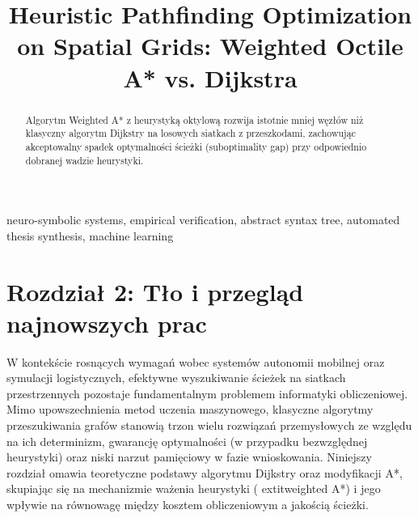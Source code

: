 \documentclass[conference]{IEEEtran}
\begin{document}
\title{Heuristic Pathfinding Optimization on Spatial Grids: Weighted Octile A* vs. Dijkstra}

\author{
}

\maketitle
\thispagestyle{plain}

\begin{abstract}
Algorytm Weighted A* z heurystyką oktylową rozwija istotnie mniej węzłów niż klasyczny algorytm Dijkstry na losowych siatkach z przeszkodami, zachowując akceptowalny spadek optymalności ścieżki (suboptimality gap) przy odpowiednio dobranej wadzie heurystyki.
\end{abstract}

\begin{IEEEkeywords}
neuro-symbolic systems, empirical verification, abstract syntax tree, automated thesis synthesis, machine learning
\end{IEEEkeywords}

\section{Rozdział 2: Tło i przegląd najnowszych prac}
W kontekście rosnących wymagań wobec systemów autonomii mobilnej oraz symulacji logistycznych, efektywne wyszukiwanie ścieżek na siatkach przestrzennych pozostaje fundamentalnym problemem informatyki obliczeniowej. Mimo upowszechnienia metod uczenia maszynowego, klasyczne algorytmy przeszukiwania grafów stanowią trzon wielu rozwiązań przemysłowych ze względu na ich determinizm, gwarancję optymalności (w przypadku bezwzględnej heurystyki) oraz niski narzut pamięciowy w fazie wnioskowania\cite{tang2026scaling}. Niniejszy rozdział omawia teoretyczne podstawy algorytmu Dijkstry oraz modyfikacji A*, skupiając się na mechanizmie ważenia heurystyki (	extit{weighted A*}) i jego wpływie na równowagę między kosztem obliczeniowym a jakością ścieżki.\n
\end{document}
